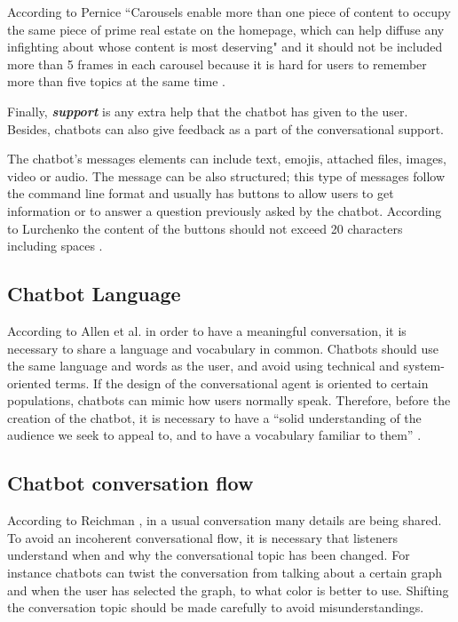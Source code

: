 \documentclass[a4paper,10pt]{article}
\begin{document}
According to Pernice ``Carousels enable more than one piece of content to occupy the same piece of prime real estate on the homepage, which can help diffuse any infighting about whose content is most deserving" and it should not be included more than 5 frames in each carousel because it is hard for users to remember more than five topics at the same time \cite{carousel}.  


Finally, \textbf{\textit{support}} is any extra help that the chatbot has given to the user. Besides, chatbots can also give feedback as a part of the conversational support. 

The chatbot's messages elements can include text, emojis, attached files, images, video or audio. The message can be also structured; this type of messages follow the command line format and usually has buttons to allow users to get information or to answer a question previously asked by the chatbot. According to Lurchenko the content of the buttons should not exceed 20 characters including spaces \cite{CheatSheet}.

\subsection*{Chatbot Language}
According to Allen et al. \cite{allen1978conversation} in order to have a meaningful conversation, it is necessary to share a language and vocabulary in common. Chatbots should use the same language and words as the user, and avoid using technical and system-oriented terms. If the design of the conversational agent is oriented to certain populations, chatbots can mimic how users normally speak.  Therefore, before the creation of the chatbot, it is necessary to have a ``solid understanding of the audience we seek to appeal to, and to have a vocabulary familiar to them”  \cite{HeuristicsWebPage}. 

\subsection*{Chatbot conversation flow}
According to Reichman \cite{reichman1985getting}, in a usual conversation many details are being shared. To avoid an incoherent conversational flow, it is necessary that listeners understand when and why the conversational topic has been changed. For instance chatbots can twist the conversation from talking about a certain graph and when the user has selected the graph, to what color is better to use. Shifting the conversation topic should be made carefully to avoid misunderstandings. 
\end{document}
